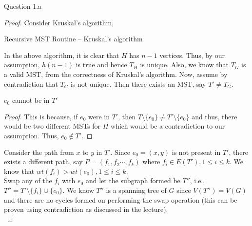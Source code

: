 \begin{solution}{Question 1.a}
\begin{proof}
        Consider Kruskal's algorithm,
        \begin{algorithm}[H]
            \caption{Recursive MST Routine -- Kruskal's algorithm} %
            \begin{algorithmic}[1]
                    \Else{}
                    \EndIf{}
                \EndFor{}
                    \Else{}
                    \EndIf{}
                \EndFor{}
            \end{algorithmic}
        \end{algorithm}
        In the above algorithm, it is clear that $H$ has $n-1$ vertices. Thus, by our assumption, $h(n-1)$ is true and hence $T_H$ is unique. Also, we know that $T_G$ is a valid MST, from the correctness of Kruskal's algorithm. Now, assume by contradiction that $T_G$ is not unique. Then there exists an MST, say $T'\neq T_G$.
        \begin{claim}[]
            $e_0$ cannot be in $T'$
        \end{claim}
        \begin{proof}
            This is because, if $e_0$ were in $T'$, then $T\setminus\{e_0\}\neq T'\setminus\{e_0\}$ and thus, there would be two different MSTs for $H$ which would be a contradiction to our assumption. Thus, $e_0\notin T'$.
        \end{proof}
        Consider the path from $x$ to $y$ in $T'$. Since $e_0=(x, y)$ is not present in $T'$, there exists a different path, say $P=(f_1,f_2\cdots,f_k)$ where $f_i\in E(T'), 1\leq i \leq k$. We know that $wt(f_i) > wt(e_0), 1 \leq i \leq k$.\\
        Swap any of the $f_i$ with $e_0$ and let the subgraph formed be $T''$, i.e., $T''=T'\setminus\{f_i\}\cup\{e_0\}$. We know $T''$ is a spanning tree of $G$ since $V(T'')=V(G)$ and there are no cycles formed on performing the swap operation (this can be proven using contradiction as discussed in the lecture).\\

\end{proof}
\end{solution}
